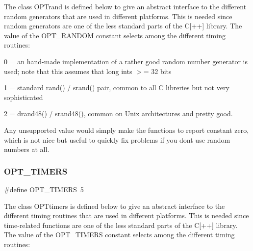 The class O\+P\+Trand is defined below to give an abstract interface to the different random generators that are used in different platforms. This is needed since random generators are one of the less standard parts of the C\mbox{[}++\mbox{]} library. The value of the O\+P\+T\+\_\+\+R\+A\+N\+D\+OM constant selects among the different timing routines\+:


\begin{DoxyItemize}
\item 0 = an hand-\/made implementation of a rather good random number generator is used; note that this assumes that long ints $>$= 32 bits
\item 1 = standard rand() / srand() pair, common to all C libreries but not very sophisticated
\item 2 = drand48() / srand48(), common on Unix architectures and pretty good.
\end{DoxyItemize}

Any unsupported value would simply make the functions to report constant zero, which is not nice but useful to quickly fix problems if you don\textquotesingle{}t use random numbers at all. \mbox{\label{group___o_p_t_u_t_i_l_s___m_a_c_r_o_s_gaf6f82b9aa17f7142fce27b3b495eadb9}} 
\subsubsection{\texorpdfstring{O\+P\+T\+\_\+\+T\+I\+M\+E\+RS}{OPT\_TIMERS}}
{\footnotesize\ttfamily \#define O\+P\+T\+\_\+\+T\+I\+M\+E\+RS~5}

The class O\+P\+Ttimers is defined below to give an abstract interface to the different timing routines that are used in different platforms. This is needed since time-\/related functions are one of the less standard parts of the C\mbox{[}++\mbox{]} library. The value of the O\+P\+T\+\_\+\+T\+I\+M\+E\+RS constant selects among the different timing routines\+:


